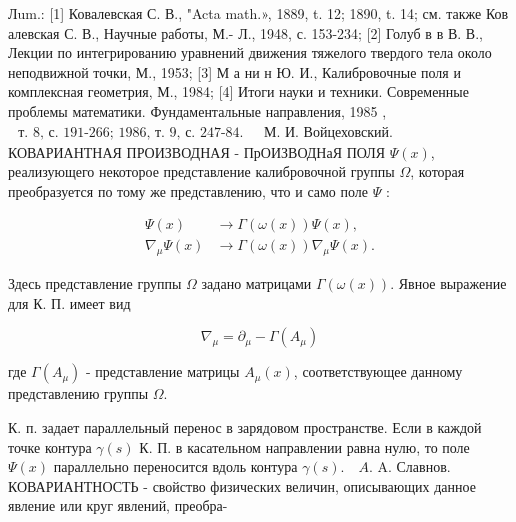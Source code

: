 \documentclass[10pt]{article}
\begin{document}
Лum.: [1] Ковалевская С. В., "Acta math.», 1889, t. 12; 1890, t. 14; см. также Ков алевская С. В., Научные работы, М.- Л., 1948, с. 153-234; [2] Голуб в в В. В., Лекции по интегрированию уравнений движения тяжелого твердого тела около неподвижной точки, М., 1953; [3] М а ни н Ю. И., Калибровочные поля и комплексная геометрия, М., 1984; [4] Итоги науки и техники. Современные проблемы математики. Фундаментальные направления, 1985 , $\begin{array}{ll}\text { т. 8, с. 191-266; 1986, т. 9, с. 247-84. } & \text { М. И. Войцеховский. }\end{array}$ КОВАРИАНТНАЯ ПРОИЗВОДНАЯ - ПрОИЗВОДНаЯ ПОЛЯ $\Psi(x)$, реализующего некоторое представление калибровочной группы $\Omega$, которая преобразуется по тому же представлению, что и само поле $\Psi$ :



\[

\begin{aligned}

\Psi(x) & \rightarrow \Gamma(\omega(x)) \Psi(x), \\

\nabla_{\mu} \Psi(x) & \rightarrow \Gamma(\omega(x)) \nabla_{\mu} \Psi(x) .

\end{aligned}

\]



Здесь представление группы $\Omega$ задано матрицами $\Gamma(\omega(x))$. Явное выражение для К. П. имеет вид



\[

\nabla_{\mu}=\partial_{\mu}-\Gamma\left(A_{\mu}\right)

\]



где $\Gamma\left(A_{\mu}\right)$ - представление матрицы $A_{\mu}(x)$, соответствующее данному представлению группы $\Omega$.



К. п. задает параллельный перенос в зарядовом пространстве. Если в каждой точке контура $\gamma(s)$ К. П. в касательном направлении равна нулю, то поле $\Psi(x)$ параллельно переносится вдоль контура $\gamma(s) . \quad A$. A. Славнов. КОВАРИАНТНОСТЬ - свойство физических величин, описывающих данное явление или круг явлений, преобра-
\end{document}
